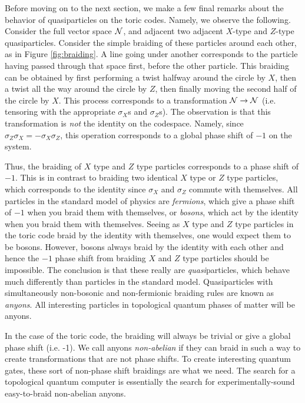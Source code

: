 \documentclass{article}
\theoremstyle{definition}
\numberwithin{figure}{section}
\begin{document}
Before moving on to the next section, we make a few final remarks about the behavior of quasiparticles on the toric codes. Namely, we observe the following. Consider the full vector space $\mathcal{N}$, and adjacent two adjacent $X$-type and $Z$-type quasiparticles. Consider the simple braiding of these particles around each other, as in Figure \ref{fig:braiding}. A line going under another corresponds to the particle having passed through that space first, before the other particle. This braiding can be obtained by first performing a twist halfway around the circle by $X$, then a twist all the way around the circle by $Z$, then finally moving the second half of the circle by $X$. This process corresponds to a transformation $\mathcal{N}\to \mathcal{N}$ (i.e. tensoring with the appropriate $\sigma_X$s and $\sigma_Z$s). The observation is that this transformation is \textit{not} the identity on the codespace. Namely, since $\sigma_Z\sigma_X=-\sigma_X\sigma_Z$, this operation corresponds to a global phase shift of $-1$ on the system.

Thus, the braiding of $X$ type and $Z$ type particles corresponds to a phase shift of $-1$. This is in contrast to braiding two identical $X$ type or $Z$ type particles, which corresponds to the identity since $\sigma_X$ and $\sigma_Z$ commute with themselves. All particles in the standard model of physics are \textit{fermions}, which give a phase shift of $-1$ when you braid them with themselves, or \textit{bosons}, which act by the identity when you braid them with themselves. Seeing as $X$ type and $Z$ type particles in the toric code braid by the identity with themselves, one would expect them to be bosons. However, bosons always braid by the identity with each other and hence the $-1$ phase shift from braiding $X$ and $Z$ type particles should be impossible. The conclusion is that these really are \textit{quasi}particles, which behave much differently than particles in the standard model. Quasiparticles with simultaneously non-bosonic and non-fermionic braiding rules are known as \textit{anyons}. All interesting particles in topological quantum phases of matter will be anyons.

In the case of the toric code, the braiding will always be trivial or give a global phase shift (i.e. -1). We call anyons \textit{non-abelian} if they can braid in such a way to create transformations that are not phase shifts. To  create interesting quantum gates, these sort of non-phase shift braidings are what we need. The search for a topological quantum computer is essentially the search for experimentally-sound easy-to-braid non-abelian anyons.
\end{document}
